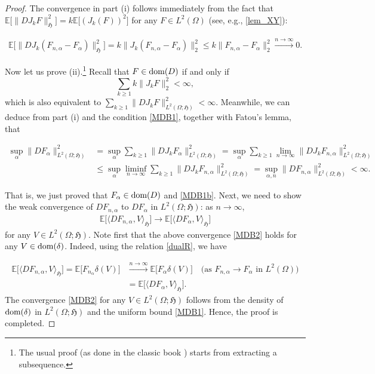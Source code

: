 \documentclass[letterpaper, 11pt,  reqno]{amsart}
\newcommand{\noi}{\noindent}
\newcommand{\E}{\mathbb{E}}
\newcommand{\al}{\alpha}
\newcommand{\dl}{\delta}
\renewcommand{\O}{\Omega}
\newcommand{\jb}[1]
{\langle #1 \rangle}
\newcommand{\fH}{\mathfrak{H}}
\newcommand{\dom}{\textup{dom}}
\numberwithin{equation}{section}
\numberwithin{theorem}{section}
\begin{document}
\begin{proof}  
The convergence in part (i) follows immediately from 
the fact that $\E\big[ \| DJ_k F \|_\fH^2 \big] = k \E\big[ ( J_k(F) )^2 \big]$
for any $F\in L^2(\O)$ (see, e.g., \eqref{lem_XY}):

\noi
\begin{align*}
\E\big[ \| DJ_k (F_{n,\al} - F_\al )\|^2_\fH  \big]
= k \| J_k (F_{n,\al} - F_\al )\|^2_2  \leq k \| F_{n,\al} - F_\al \|^2_2 \xrightarrow{n\to\infty} 0.
\end{align*}

\smallskip

Now let us prove (ii).\footnote{The 
usual proof (as done in the classic book \cite{Nua06})
starts from extracting a subsequence. }
Recall that $F\in\dom(D)$ if and only if 
\[
 \sum_{k\geq 1} k  \|  J_k F \|_2^2 < \infty,
\]
which is also equivalent to $ \sum_{k\geq 1}   \| D J_k F \|^2_{L^2(\O;\fH)} < \infty$.
Meanwhile, we can deduce from part (i) and the condition \eqref{MDB1},
together with Fatou's lemma,
 that

\noi
\begin{align*}
\sup_{\al} \| DF_\al \|^2_{L^2(\O;\fH)} 
 &=  \sup_{\al} \sum_{k\geq 1}   \| D J_k F_\al \|^2_{L^2(\O;\fH)}  
 =  \sup_{\al}  \sum_{k\geq 1}  \lim_{n\to\infty}  \| D J_k F_{n,\al} \|^2_{L^2(\O;\fH)}   \\
 &\leq \sup_{\al} \liminf_{n\to\infty} \sum_{k\geq 1}  \| D J_k F_{n,\al} \|^2_{L^2(\O;\fH)}   
 = \sup_{\al, n}  \| D  F_{n,\al} \|^2_{L^2(\O;\fH)}   < \infty.
\end{align*}

\noi
That is, we just proved that $F_\al\in\dom(D)$ and \eqref{MDB1b}. 
Next, we need to show the weak convergence
of $DF_{n, \al}$ to $DF_\al$ in $L^2(\O;\fH)$: as $n\to\infty$,
\begin{align}\label{MDB2}
\E\big[ \jb{ DF_{n,\al}, V}_\fH \big] \to \E\big[ \jb{ DF_\al, V}_\fH \big] 
\end{align}
for any $V\in L^2(\O; \fH)$. Note first that the above convergence \eqref{MDB2} holds for
any $V\in\dom(\dl)$. Indeed, using the relation \eqref{dualR},
we have 

\noi
\begin{align*}
\E\big[ \jb{ DF_{n, \al}, V}_\fH \big]
= \E\big[ F_{n_\al} \dl(V) \big]  
&\xrightarrow{n\to\infty}   \E\big[ F_\al \dl(V) \big] 
\quad \text{(as $F_{n,\al}\to F_\al$ in $L^2(\O)$)} \\
&  = \E\big[ \jb{ DF_\al, V}_\fH \big] .
\end{align*}
The convergence \eqref{MDB2} for any $V\in L^2(\O; \fH)$
follows from the density of $\dom(\dl)$ in $L^2(\O;\fH)$
and the uniform bound \eqref{MDB1}. 
Hence, the proof  is completed. \qedhere


\end{proof}
\end{document}
